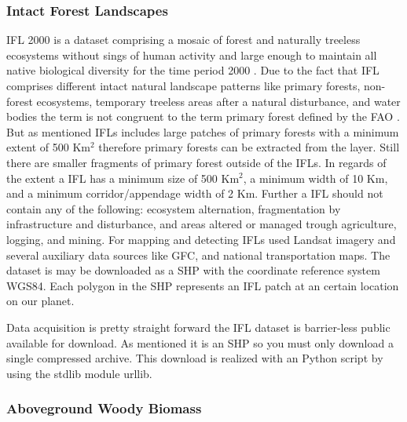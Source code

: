		\subsubsection{Intact Forest Landscapes}
			\ac{IFL} 2000 is a dataset comprising a mosaic of forest and naturally treeless ecosystems without sings of human activity and large enough to maintain all native biological diversity for the time period 2000 \citep{Potapov2017}. Due to the fact that \ac{IFL} comprises different intact natural landscape patterns like primary forests, non-forest ecosystems, temporary treeless areas after a natural disturbance, and water bodies the term is not congruent to the term primary forest defined by the \ac{FAO} \citep{FAO2012}. But as mentioned \ac{IFL}s includes large patches of primary forests with a minimum extent of 500 Km$^2$ therefore primary forests can be extracted from the layer. Still there are smaller fragments of primary forest outside of the \ac{IFL}s. In regards of the extent a \ac{IFL} has a minimum size of 500 Km$^2$, a minimum width of 10 Km, and a minimum corridor/appendage width of 2 Km. Further a \ac{IFL} should not contain any of the following: ecosystem alternation, fragmentation by infrastructure and disturbance, and areas altered or managed trough agriculture, logging, and mining. For mapping and detecting \ac{IFL}s \citeauthor{Potapov2017} used Landsat imagery and several auxiliary data sources like \ac{GFC}, and national transportation maps. The dataset is may be downloaded as a \ac{SHP} with the coordinate reference system \ac{WGS84}. Each polygon in the \ac{SHP} represents an \ac{IFL} patch at an certain location on our planet.

			Data acquisition is pretty straight forward the \ac{IFL} dataset is barrier-less public available for download. As mentioned it is an \ac{SHP} so you must only download a single compressed archive. This download is realized with an Python script by using the \ac{stdlib} module urllib.

		\subsubsection{Aboveground Woody Biomass}
			
